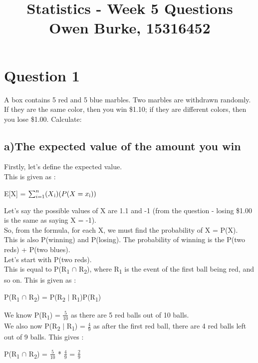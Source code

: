 \documentclass{report}
\title{\textbf{Statistics - Week 5 Questions}\\Owen Burke, 15316452}
\begin{document}
	\maketitle
	\section*{\hfil Question 1 \hfil}
	A box contains 5 red and 5 blue marbles. Two marbles are withdrawn
	randomly. If they are the same color, then you win \$1.10; if they are different colors, then
	you lose \$1.00. Calculate:
	
		\subsection*{a)The expected value of the amount you win}
		
		Firstly, let's define the expected value.\\
		This is given as :
		
		\begin{center}
			E[X] = $\sum_{i=1}^{n} (X\textsubscript{i})(P(X = x\textsubscript{i}))$
		\end{center}
	
		Let's say the possible values of X are 1.1 and -1 (from the question - losing \$1.00 is the same as saying X = -1).\\
		So, from the formula, for each X, we must find the probability of X = P(X).\\
		This is also P(winning) and P(losing). The probability of winning is the P(two reds) + P(two blues).\\
		Let's start with P(two reds).\\
		This is equal to P(R\textsubscript{1} $\cap$ R\textsubscript{2}), where R\textsubscript{1} is the event of the
		first ball being red, and so on. This is given as :
		
		\begin{center}
			P(R\textsubscript{1} $\cap$ R\textsubscript{2}) = P(R\textsubscript{2} $\vert$ R\textsubscript{1})P(R\textsubscript{1})
		\end{center}
	
		We know P(R\textsubscript{1}) = $\frac{5}{10}$ as there are 5 red balls out of 10 balls.\\
		We also now P(R\textsubscript{2} $\vert$ R\textsubscript{1}) = $\frac{4}{9}$ as after the first red ball, there are 4 red balls left out of 9 balls.
		This gives :
		
		\begin{center}
			P(R\textsubscript{1} $\cap$ R\textsubscript{2}) = $\frac{5}{10}$ * $\frac{4}{9}$ = $\frac{2}{9}$
		\end{center}
	
\end{document}
